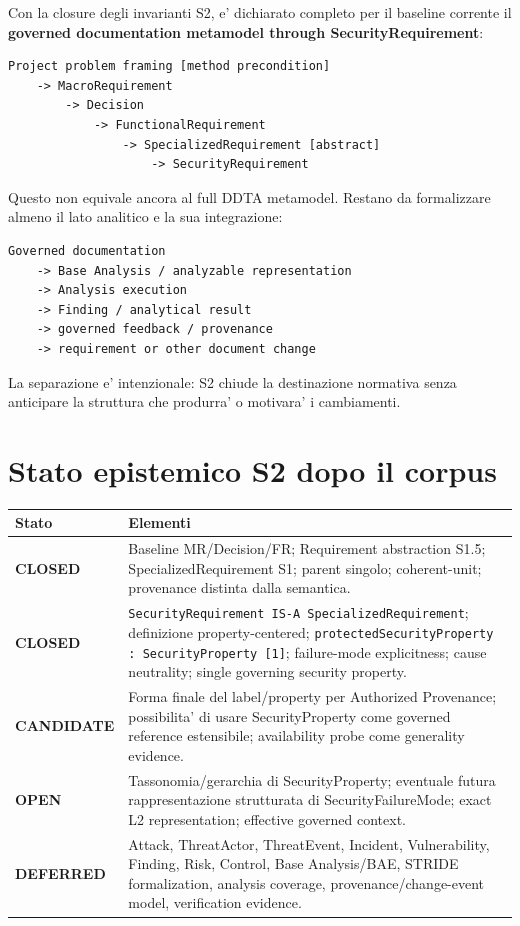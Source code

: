 \documentclass[11pt,a4paper]{article}
\newcommand{\closed}{\textbf{CLOSED}}
\newcommand{\candidate}{\textbf{CANDIDATE}}
\newcommand{\openstatus}{\textbf{OPEN}}
\newcommand{\deferred}{\textbf{DEFERRED}}
\begin{document}
Con la closure degli invarianti S2, e' dichiarato completo per il baseline corrente il \textbf{governed documentation metamodel through SecurityRequirement}:

\begin{lstlisting}
Project problem framing [method precondition]
    -> MacroRequirement
        -> Decision
            -> FunctionalRequirement
                -> SpecializedRequirement [abstract]
                    -> SecurityRequirement
\end{lstlisting}

Questo non equivale ancora al full DDTA metamodel. Restano da formalizzare almeno il lato analitico e la sua integrazione:

\begin{lstlisting}
Governed documentation
    -> Base Analysis / analyzable representation
    -> Analysis execution
    -> Finding / analytical result
    -> governed feedback / provenance
    -> requirement or other document change
\end{lstlisting}

La separazione e' intenzionale: S2 chiude la destinazione normativa senza anticipare la struttura che produrra' o motivara' i cambiamenti.

\section{Stato epistemico S2 dopo il corpus}

\begin{longtable}{p{}p{}}
\toprule
\textbf{Stato} & \textbf{Elementi} \\
\midrule
\endhead
\closed & Baseline MR/Decision/FR; Requirement abstraction S1.5; SpecializedRequirement S1; parent singolo; coherent-unit; provenance distinta dalla semantica. \\
\addlinespace
\closed & \texttt{SecurityRequirement IS-A SpecializedRequirement}; definizione property-centered; \texttt{protectedSecurityProperty : SecurityProperty [1]}; failure-mode explicitness; cause neutrality; single governing security property. \\
\addlinespace
\candidate & Forma finale del label/property per Authorized Provenance; possibilita' di usare SecurityProperty come governed reference estensibile; availability probe come generality evidence. \\
\addlinespace
\openstatus & Tassonomia/gerarchia di SecurityProperty; eventuale futura rappresentazione strutturata di SecurityFailureMode; exact L2 representation; effective governed context. \\
\addlinespace
\deferred & Attack, ThreatActor, ThreatEvent, Incident, Vulnerability, Finding, Risk, Control, Base Analysis/BAE, STRIDE formalization, analysis coverage, provenance/change-event model, verification evidence. \\
\bottomrule
\end{longtable}
\end{document}
